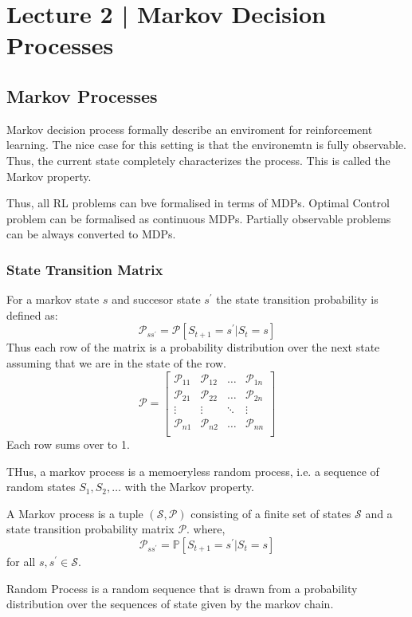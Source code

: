 \section{{Lecture 2 | Markov Decision Processes}}
\subsection{Markov Processes}
Markov decision process formally describe an enviroment for reinforcement
learning. The nice case for this setting is that the environemtn is fully observable. Thus,
the current state completely characterizes the process. This is called the Markov property.

Thus, all RL problems can bve formalised in terms of MDPs. Optimal Control problem can be 
formalised as continuous MDPs. Partially observable problems can be always converted 
to MDPs.
\subsubsection*{State Transition Matrix}
For a markov state \(s\) and succesor state \(s^{\prime} \) the state transition probability
is defined as:
\begin{equation}
    \mathcal{P} _{ss^{\prime}} = \mathcal{P} [S_{t+1} = s^{\prime} | S_{t} = s]
\end{equation}
Thus each row of the matrix is a probability distribution over the next state assuming
that we are in the state of the row. 
\[
    \mathcal{P} = 
    \begin{bmatrix}
        \mathcal{P} _{11} & \mathcal{P} _{12} & \dots & \mathcal{P} _{1n} \\
        \mathcal{P} _{21} & \mathcal{P} _{22} & \dots & \mathcal{P} _{2n} \\
        \vdots & \vdots & \ddots & \vdots \\
        \mathcal{P} _{n1} & \mathcal{P} _{n2} & \dots & \mathcal{P} _{nn} \\
    \end{bmatrix}  
\]
Each row sums over to 1.

THus, a markov process is a memoeryless random process, i.e. a sequence of random states
\(S_{1}, S_{2}, \dots \) with the Markov property. 

\begin{definition}
    A Markov process is a tuple \((\mathcal{S}, \mathcal{P} )\) consisting of a finite set
    of states \(\mathcal{S} \) and a state transition probability matrix \(\mathcal{P} \).
    where,
    \[
        \mathcal{P} _{ss^{\prime}} = \mathbb{P}  [S_{t+1} = s^{\prime} | S_{t} = s]  
    \]
    for all \(s, s^{\prime} \in \mathcal{S} \).
\end{definition}
Random Process is a random sequence that is drawn from a probability distribution over 
the sequences of state given by the markov chain.

